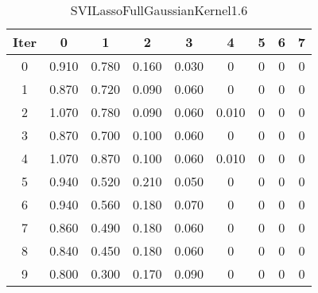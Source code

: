 \begin{table}
	\begin{center}
		\begin{tabular}{|c|c|c|c|c|c|c|c|c|}
			\hline
			Iter & 0 & 1 & 2 & 3 & 4 & 5 & 6 & 7 \\
			\hline
			0 & 0.910 & 0.780 & 0.160 & 0.030 & 0 & 0 & 0 & 0 \\
			\hline
			1 & 0.870 & 0.720 & 0.090 & 0.060 & 0 & 0 & 0 & 0 \\
			\hline
			2 & 1.070 & 0.780 & 0.090 & 0.060 & 0.010 & 0 & 0 & 0 \\
			\hline
			3 & 0.870 & 0.700 & 0.100 & 0.060 & 0 & 0 & 0 & 0 \\
			\hline
			4 & 1.070 & 0.870 & 0.100 & 0.060 & 0.010 & 0 & 0 & 0 \\
			\hline
			5 & 0.940 & 0.520 & 0.210 & 0.050 & 0 & 0 & 0 & 0 \\
			\hline
			6 & 0.940 & 0.560 & 0.180 & 0.070 & 0 & 0 & 0 & 0 \\
			\hline
			7 & 0.860 & 0.490 & 0.180 & 0.060 & 0 & 0 & 0 & 0 \\
			\hline
			8 & 0.840 & 0.450 & 0.180 & 0.060 & 0 & 0 & 0 & 0 \\
			\hline
			9 & 0.800 & 0.300 & 0.170 & 0.090 & 0 & 0 & 0 & 0 \\
			\hline
		\end{tabular}
	\end{center}
	\caption{SVILassoFullGaussianKernel1.6}
\end{table}
